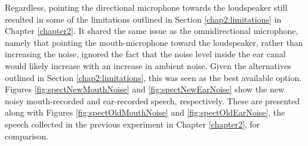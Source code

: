 Regardless, pointing the directional microphone towards the loudspeaker still resulted in some of the limitations outlined in Section \ref{chap2:limitations} in Chapter \ref{chapter2}.  
It shared the same issue as the omnidirectional microphone, namely that pointing the mouth-microphone toward the loudspeaker, rather than increasing the noise, ignored the fact that the noise level inside the ear canal would likely increase with an increase in ambient noise.  Given the alternatives outlined in Section \ref{chap2:limitations}, this was seen as the best available option.  Figures \ref{fig:spectNewMouthNoise} and \ref{fig:spectNewEarNoise} show the new noisy mouth-recorded and ear-recorded speech, respectively.  These are presented along with Figures \ref{fig:spectOldMouthNoise} and \ref{fig:spectOldEarNoise}, the speech collected in the previous experiment in Chapter \ref{chapter2}, for comparison.

